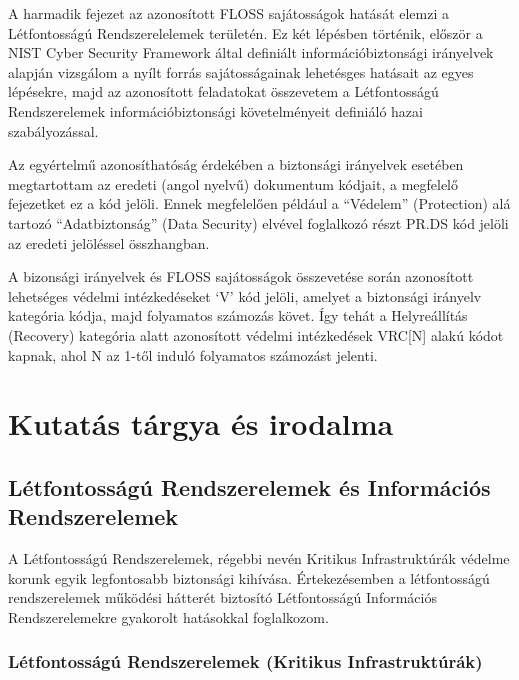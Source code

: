 \documentclass[12pt,magyar,a4paper,oneside]{scrreprt}
\begin{document}
A harmadik fejezet az azonosított FLOSS sajátosságok hatását elemzi a
Létfontosságú Rendszerelelemek területén. Ez két lépésben történik,
először a NIST Cyber Security Framework által definiált
információbiztonsági irányelvek alapján vizsgálom a nyílt forrás
sajátosságainak lehetésges hatásait az egyes lépésekre, majd az
azonosított feladatokat összevetem a Létfontosságú Rendszerelemek
információbiztonsági követelményeit definiáló hazai szabályozással.

Az egyértelmű azonosíthatóság érdekében a biztonsági irányelvek esetében
megtartottam az eredeti (angol nyelvű) dokumentum kódjait, a megfelelő
fejezetket ez a kód jelöli. Ennek megfelelően például a ``Védelem''
(Protection) alá tartozó ``Adatbiztonság'' (Data Security) elvével
foglalkozó részt PR.DS kód jelöli az eredeti jelöléssel összhangban.

A bizonsági irányelvek és FLOSS sajátosságok összevetése során
azonosított lehetséges védelmi intézkedéseket `V' kód jelöli, amelyet a
biztonsági irányelv kategória kódja, majd folyamatos számozás követ. Így
tehát a Helyreállítás (Recovery) kategória alatt azonosított védelmi
intézkedések VRC{[}N{]} alakú kódot kapnak, ahol N az 1-től induló
folyamatos számozást jelenti.

\hypertarget{kutatuxe1s-tuxe1rgya-uxe9s-irodalma}{%
\chapter{Kutatás tárgya és
irodalma}\label{kutatuxe1s-tuxe1rgya-uxe9s-irodalma}}

\hypertarget{luxe9tfontossuxe1guxfa-rendszerelemek-uxe9s-informuxe1ciuxf3s-rendszerelemek}{%
\section{Létfontosságú Rendszerelemek és Információs
Rendszerelemek}\label{luxe9tfontossuxe1guxfa-rendszerelemek-uxe9s-informuxe1ciuxf3s-rendszerelemek}}

A Létfontosságú Rendszerelemek, régebbi nevén Kritikus Infrastruktúrák
védelme korunk egyik legfontosabb biztonsági kihívása. Értekezésemben a
létfontosságú rendszerelemek működési hátterét biztosító Létfontosságú
Információs Rendszerelemekre gyakorolt hatásokkal foglalkozom.

\hypertarget{luxe9tfontossuxe1guxfa-rendszerelemek-kritikus-infrastruktuxfaruxe1k}{%
\subsection{Létfontosságú Rendszerelemek (Kritikus
Infrastruktúrák)}\label{luxe9tfontossuxe1guxfa-rendszerelemek-kritikus-infrastruktuxfaruxe1k}}
\end{document}
